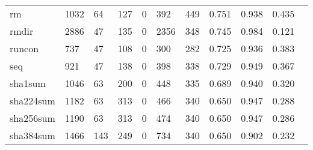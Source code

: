 \begin{longtable}{lp{1.10cm}p{1.10cm}p{1.10cm}p{1.10cm}p{1.10cm}p{1.10cm}p{1.10cm}p{1.10cm}p{1.10cm}p{1.10cm}}
rm        &                   1032 &                                 64 &                               127 &                                0 &                               392 &                             449 &                          0.751 &                                 0.938 &                               0.435 \\
rmdir     &                   2886 &                                 47 &                               135 &                                0 &                              2356 &                             348 &                          0.745 &                                 0.984 &                               0.121 \\
runcon    &                    737 &                                 47 &                               108 &                                0 &                               300 &                             282 &                          0.725 &                                 0.936 &                               0.383 \\
seq       &                    921 &                                 47 &                               138 &                                0 &                               398 &                             338 &                          0.729 &                                 0.949 &                               0.367 \\
sha1sum   &                   1046 &                                 63 &                               200 &                                0 &                               448 &                             335 &                          0.689 &                                 0.940 &                               0.320 \\
sha224sum &                   1182 &                                 63 &                               313 &                                0 &                               466 &                             340 &                          0.650 &                                 0.947 &                               0.288 \\
sha256sum &                   1190 &                                 63 &                               313 &                                0 &                               474 &                             340 &                          0.650 &                                 0.947 &                               0.286 \\
sha384sum &                   1466 &                                143 &                               249 &                                0 &                               734 &                             340 &                          0.650 &                                 0.902 &                               0.232 \\

\end{longtable}
